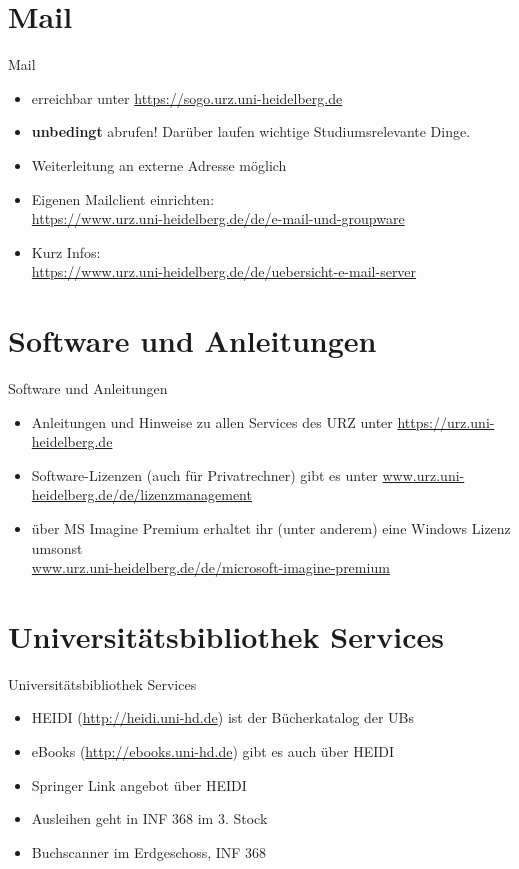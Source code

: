 \section{Mail}
\begin{frame}{Mail}
    \begin{itemize}
        \item erreichbar unter \url{https://sogo.urz.uni-heidelberg.de}
        \item \textbf{unbedingt} abrufen! Darüber laufen wichtige Studiumsrelevante Dinge.
        \item Weiterleitung an externe Adresse möglich
        \item Eigenen Mailclient einrichten: \\ \url{https://www.urz.uni-heidelberg.de/de/e-mail-und-groupware}
        \item Kurz Infos: \\ \url{https://www.urz.uni-heidelberg.de/de/uebersicht-e-mail-server}
    \end{itemize}
\end{frame}

\section{Software und Anleitungen}
\begin{frame}{Software und Anleitungen}
    \begin{itemize}
        \item Anleitungen und Hinweise zu allen Services des URZ unter {\url{https://urz.uni-heidelberg.de}}
        \item Software-Lizenzen (auch für Privatrechner) gibt es unter
            {\url{www.urz.uni-heidelberg.de/de/lizenzmanagement}}
        \item über MS Imagine Premium erhaltet ihr (unter anderem) eine Windows Lizenz umsonst\\
            {\small\url{www.urz.uni-heidelberg.de/de/microsoft-imagine-premium}}
    \end{itemize}
\end{frame}

\section{Universitätsbibliothek Services}
\begin{frame}{Universitätsbibliothek Services}
    \begin{itemize}\pause
        \item HEIDI {(\url{http://heidi.uni-hd.de})} ist der Bücherkatalog der UBs\pause
        \item eBooks {(\url{http://ebooks.uni-hd.de})} gibt es auch über HEIDI\pause
        \item Springer Link angebot über HEIDI
        \item Ausleihen geht in INF 368 im 3. Stock\pause
        \item Buchscanner im Erdgeschoss, INF 368\pause
    \end{itemize}
\end{frame}

